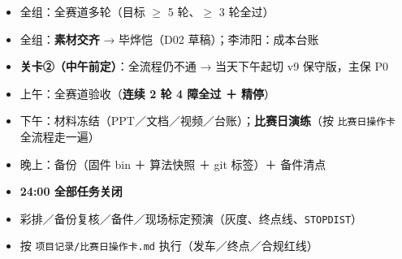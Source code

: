 \documentclass[10.5pt]{article}
\begin{document}
\par\vspace{2pt}
\begin{itemize}\setlength{\itemsep}{1pt}\setlength{\parskip}{0pt}
\item 全组：全赛道多轮（目标 $\geq$ 5 轮、$\geq$ 3 轮全过）
\item 全组：\textbf{素材交齐} → 毕烨恺（D02 草稿）；李沛阳：成本台账
\item \textbf{关卡②（中午前定）}：全流程仍不通 → 当天下午起切 v9 保守版，主保 P0
\end{itemize}
\par\vspace{2pt}
\begin{itemize}\setlength{\itemsep}{1pt}\setlength{\parskip}{0pt}
\item 上午：全赛道验收（\textbf{连续 2 轮 4 障全过 ＋ 精停}）
\item 下午：材料冻结（PPT／文档／视频／台账）；\textbf{比赛日演练}（按 \texttt{比赛日操作卡} 全流程走一遍）
\item 晚上：备份（固件 bin ＋ 算法快照 ＋ git 标签）＋ 备件清点
\item \textbf{24:00 全部任务关闭}
\end{itemize}
\par\vspace{2pt}
\begin{itemize}\setlength{\itemsep}{1pt}\setlength{\parskip}{0pt}
\item 彩排／备份复核／备件／现场标定预演（灰度、终点线、\texttt{STOPDIST}）
\end{itemize}
\par\vspace{2pt}
\begin{itemize}\setlength{\itemsep}{1pt}\setlength{\parskip}{0pt}
\item 按 \texttt{项目记录/比赛日操作卡.md} 执行（发车／终点／合规红线）
\end{itemize}
\end{document}
